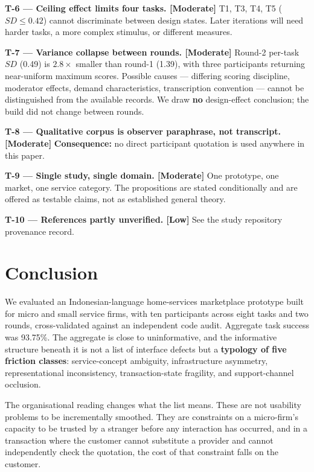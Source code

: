 \documentclass[]{interact}
\theoremstyle{plain}
\begin{document}
\textbf{T-6 --- Ceiling effect limits four tasks. [Moderate]} T1, T3, T4, T5 ($SD \leq 0.42$) cannot
discriminate between design states. Later iterations will need harder tasks, a more complex stimulus,
or different measures.

\textbf{T-7 --- Variance collapse between rounds. [Moderate]} Round-2 per-task $SD$ (0.49) is
$2.8\times$ smaller than round-1 (1.39), with three participants returning near-uniform maximum
scores. Possible causes --- differing scoring discipline, moderator effects, demand characteristics,
transcription convention --- cannot be distinguished from the available records. We draw \textbf{no}
design-effect conclusion; the build did not change between rounds.

\textbf{T-8 --- Qualitative corpus is observer paraphrase, not transcript. [Moderate]}
\textbf{Consequence:} no direct participant quotation is used anywhere in this paper.

\textbf{T-9 --- Single study, single domain. [Moderate]} One prototype, one market, one service
category. The propositions are stated conditionally and are offered as testable claims, not as
established general theory.

\textbf{T-10 --- References partly unverified. [Low]} See the study repository provenance record.

\section{Conclusion}

We evaluated an Indonesian-language home-services marketplace prototype built for micro and small
service firms, with ten participants across eight tasks and two rounds, cross-validated against an
independent code audit. Aggregate task success was 93.75\%. The aggregate is close to uninformative,
and the informative structure beneath it is not a list of interface defects but a \textbf{typology of
five friction classes}: service-concept ambiguity, infrastructure asymmetry, representational
inconsistency, transaction-state fragility, and support-channel occlusion.

The organisational reading changes what the list means. These are not usability problems to be
incrementally smoothed. They are constraints on a micro-firm's capacity to be trusted by a stranger
before any interaction has occurred, and in a transaction where the customer cannot substitute a
provider and cannot independently check the quotation, the cost of that constraint falls on the
customer.
\end{document}
